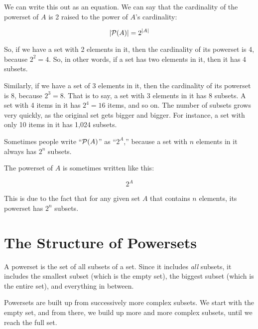 \documentclass[../../../main.tex]{subfiles}
\begin{document}
We can write this out as an equation. We can say that the cardinality of the powerset of $A$ is 2 raised to the power of $A$'s cardinality:

\begin{equation*}
  |\mathcal{P}(A)| = 2^{|A|}
\end{equation*}

So, if we have a set with 2 elements in it, then the cardinality of its powerset is 4, because $2^{2} = 4$. So, in other words, if a set has two elements in it, then it has 4 subsets. 

Similarly, if we have a set of 3 elements in it, then the cardinality of its powerset is 8, because $2^{3} = 8$. That is to say, a set with 3 elements in it has 8 subsets. A set with 4 items in it has $2^{4} = 16$ items, and so on. The number of subsets grows very quickly, as the original set gets bigger and bigger. For instance, a set with only 10 items in it has 1,024 subsets.

\begin{aside}
  \begin{notation}
    Sometimes people write ``$\mathcal{P}(A)$'' as ``$2^{A}$,'' because a set with $n$ elements in it always has $2^{n}$ subsets.
  \end{notation}
\end{aside}

The powerset of $A$ is sometimes written like this:

\begin{equation*}
  2^{A}
\end{equation*}

This is due to the fact that for any given set $A$ that contains $n$ elements, its powerset has $2^{n}$ subsets.


\section{The Structure of Powersets}

A powerset is the set of all subsets of a set. Since it includes \emph{all} subsets, it includes the smallest subset (which is the empty set), the biggest subset (which is the entire set), and everything in between.

\begin{aside}
  \begin{remark}
    Powersets are built up from successively more complex subsets. We start with the empty set, and from there, we build up more and more complex subsets, until we reach the full set.
  \end{remark}
\end{aside}
\end{document}
